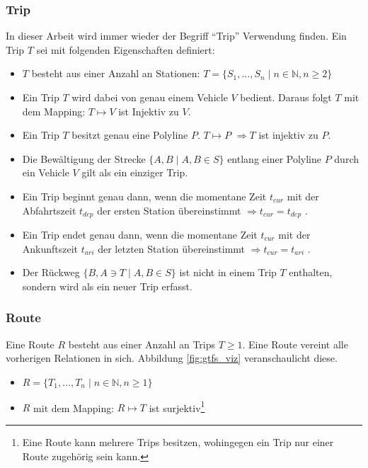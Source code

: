   \subsubsection{Trip}
  \label{ssub:trip}
    In dieser Arbeit wird immer wieder der Begriff "`Trip"' Verwendung finden. Ein Trip $T$ sei mit folgenden Eigenschaften definiert:
    \begin{itemize}
      \item $T$ besteht aus einer Anzahl an Stationen: $T = \{S_1, \dotsc, S_n \;|\; n \in \mathbb{N}, n \geq 2 \}$

      \item Ein Trip $T$ wird dabei von genau einem Vehicle $V$ bedient. Daraus folgt $T$ mit dem Mapping: $T \mapsto V$ ist Injektiv zu $V$. 

      \item Ein Trip $T$ besitzt genau eine Polyline $P$. $T \mapsto P$ $ \Rightarrow T$ ist injektiv zu $P$. 

      \item Die Bewältigung der Strecke $\{A,B \;|\; A, B \in S\}$ entlang einer Polyline $P$ durch ein Vehicle $V$ gilt als ein einziger Trip.

      \item Ein Trip beginnt genau dann, wenn die momentane Zeit $t_{cur}$ mit der Abfahrtszeit $t_{dep}$ der ersten Station übereinstimmt $\Rightarrow t_{cur} = t_{dep} $ .

      \item Ein Trip endet genau dann, wenn die momentane Zeit $t_{cur}$ mit der Ankunftszeit $t_{ari}$ der letzten Station übereinstimmt $\Rightarrow t_{cur} = t_{ari} $ .

      \item Der Rückweg $\{B, A \ni T \;|\; A, B \in S\}$ ist nicht in einem Trip $T$ enthalten, sondern wird als ein neuer Trip erfasst.
    \end{itemize}
    

    \subsubsection{Route}
    \label{ssub:route}
      Eine Route $R$ besteht aus einer Anzahl an Trips $T \geq 1$. Eine Route vereint alle vorherigen Relationen in sich. Abbildung \ref{fig:gtfs_viz} veranschaulicht diese. 

      \begin{itemize}
        \item $R = \{ T_1, \dotsc, T_n \;|\; n \in \mathbb{N}, n \geq 1 \}$

        \item $R$ mit dem Mapping: $R \mapsto T$ ist surjektiv\footnote{Eine Route kann mehrere Trips besitzen, wohingegen ein Trip nur einer Route zugehörig sein kann.} 
      \end{itemize}     

